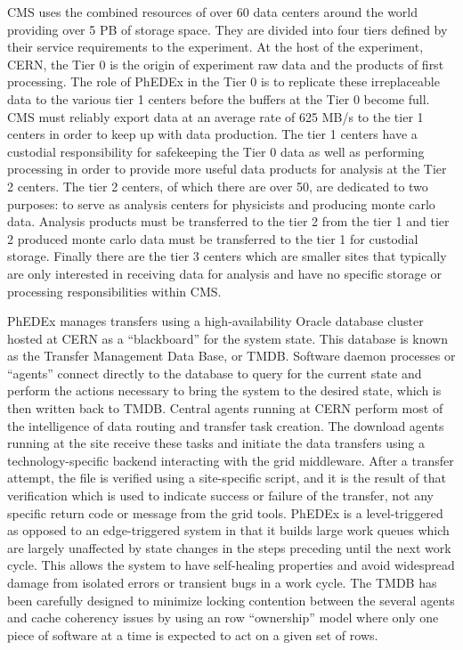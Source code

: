 \documentclass{PoS}
\begin{document}
CMS uses the combined resources of over 60 data centers around the
world providing over 5 PB of storage space.  They are divided into
four tiers defined by their service requirements to the experiment.
At the host of the experiment, CERN, the Tier 0 is the origin of
experiment raw data and the products of first processing.  The role of
PhEDEx in the Tier 0 is to replicate these irreplaceable data to the
various tier 1 centers before the buffers at the Tier 0 become full.
CMS must reliably export data at an average rate of 625 MB/s to the tier 1
centers in order to keep up with data production.  The tier 1 centers
have a custodial responsibility for safekeeping the Tier 0 data as
well as performing processing in order to provide more useful
data products for analysis at the Tier 2 centers.  The tier 2 centers,
of which there are over 50, are dedicated to two purposes: to serve as
analysis centers for physicists and producing monte carlo data.
Analysis products must be transferred to the tier 2 from the tier 1
and tier 2 produced monte carlo data must be transferred to the tier 1
for custodial storage.  Finally there are the tier 3 centers which are
smaller sites that typically are only interested in receiving data for
analysis and have no specific storage or processing responsibilities within CMS.

PhEDEx manages transfers using a high-availability Oracle database
cluster hosted at CERN as a ``blackboard'' for the system state.  This
database is known as the Transfer Management Data Base, or TMDB.
Software daemon processes or ``agents'' connect directly to the
database to query for the current state and perform the actions
necessary to bring the system to the desired state, which is then
written back to TMDB.  Central agents running at CERN perform most of
the intelligence of data routing and transfer task creation.  The
download agents running at the site receive these tasks and initiate
the data transfers using a technology-specific backend interacting
with the grid middleware.  After a transfer attempt, the file is
verified using a site-specific script, and it is the result of that
verification which is used to indicate success or failure of the
transfer, not any specific return code or message from the grid tools.
PhEDEx is a level-triggered as opposed to an edge-triggered system in
that it builds large work queues which are largely unaffected by state
changes in the steps preceding until the next work cycle.  This allows
the system to have self-healing properties and avoid widespread damage
from isolated errors or transient bugs in a work cycle.  The TMDB has
been carefully designed to minimize locking contention between the
several agents and cache coherency issues by using an row
``ownership'' model where only one piece of software at a time is
expected to act on a given set of rows.
\end{document}
